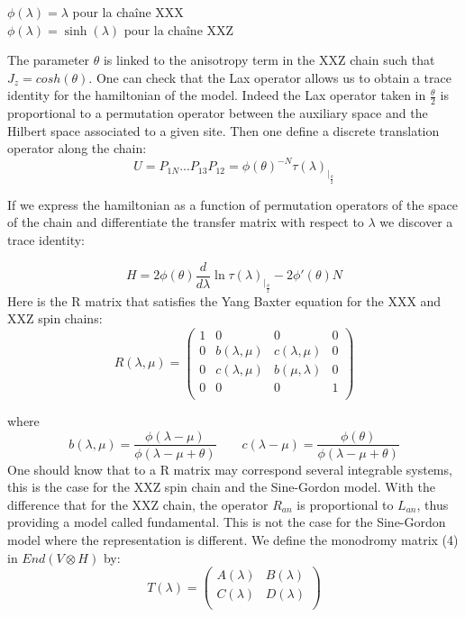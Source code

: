 \documentclass[12pt]{article}
\begin{document}
	$\phi(\lambda)=\lambda$ pour la chaîne XXX \\
	$\phi(\lambda)=\sinh(\lambda)$ pour la chaîne XXZ 

The parameter $\theta$ is linked to the anisotropy term in the XXZ chain such that $J_{z}=cosh(\theta)$. One can check that the Lax operator allows us to obtain a trace identity for the hamiltonian of the model. Indeed the Lax operator taken in $\frac{\theta}{2}$ is proportional to a permutation operator between the auxiliary space and the Hilbert space associated to a given site. 
Then one define a discrete translation operator along the chain: 
\begin{equation}
U=P_{1N}...P_{13}P_{12}
= \phi(\theta)^{-N}\tau(\lambda)_{|_{\frac{\theta}{2}}}
\end{equation}

If we express the hamiltonian as a function of permutation operators of the space of the chain and differentiate the transfer matrix with respect to $\lambda$ we discover a trace identity:

\begin{equation}
H=2\phi(\theta)\frac{d}{d\lambda}\ln\tau(\lambda)_{|_{\frac{\theta}{2}}}-2\phi'(\theta)N
\end{equation}
Here is the R matrix that satisfies the Yang Baxter equation for the XXX and XXZ spin chains:
\begin{equation}
R(\lambda,\mu)=\begin{pmatrix}
1 & 0 & 0 & 0 \\
0 &  b(\lambda,\mu) & c(\lambda,\mu) & 0 \\
0 & c(\lambda,\mu) &  b(\mu,\lambda) & 0 \\
0 & 0 & 0 & 1 \\
\end{pmatrix}
\end{equation}

where \begin{equation}
b(\lambda,\mu)=\frac{\phi(\lambda-\mu)}{\phi(\lambda-\mu+\theta)}\qquad c(\lambda-\mu)=\frac{\phi(\theta)}{\phi(\lambda-\mu+\theta)} 
\end{equation}
One should know that to a R matrix  may correspond several integrable systems, this is the case for the XXZ spin chain and the Sine-Gordon model. With the difference that for the XXZ chain, the operator $ R_ {an} $ is proportional to $ L_ {an} $, thus providing a model called fundamental. This is not the case for the Sine-Gordon model where the representation is different. 
We define the monodromy matrix (4) in $End  (V\otimes  H )$ by: 
\begin{equation}
T(\lambda)=\begin{pmatrix}
A(\lambda) & B(\lambda)\\
C(\lambda) & D(\lambda) \\
\end{pmatrix}
\end{equation}
\end{document}

